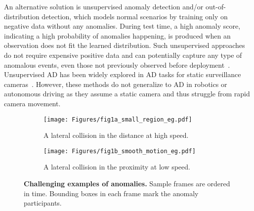 An alternative solution is unsupervised anomaly detection and/or out-of-distribution detection, which models normal scenarios by training only on negative data without any anomalies. During test time, a high anomaly score, indicating a high probability of anomalies happening, is produced when an observation does not fit the learned distribution. Such unsupervised approaches do not require expensive positive data and can potentially capture any type of anomalous events, even those not previously observed before deployment~\citep{nayak2021comprehensive}. Unsupervised AD has been widely explored in AD tasks for static surveillance cameras~\citep{luo2017revisit,hasan2016learning,morais2019learning,wang2023memory}. However, these methods do not generalize to AD in robotics or autonomous driving as they assume a static camera and thus struggle from rapid camera movement.

\begin{figure}[t]
  \centering
  \begin{subfigure}[b]{\linewidth}
    \captionsetup{justification=centering}
    \texttt{[image: Figures/fig1a\_small\_region\_eg.pdf]}
    \caption{A lateral collision in the distance at high speed.}
    \label{subfig:motivations-small-region}
  \end{subfigure}
  \begin{subfigure}[b]{\linewidth}
    \captionsetup{justification=centering}
    \texttt{[image: Figures/fig1b\_smooth\_motion\_eg.pdf]}
    \caption{A lateral collision in the proximity at low speed.}
    \label{subfig:motivations-smooth-motion}
  \end{subfigure}
  \caption{\textbf{Challenging examples of anomalies.} Sample frames are ordered in time. Bounding boxes in each frame mark the anomaly participants.}
  \label{fig:motivations}
\end{figure}


